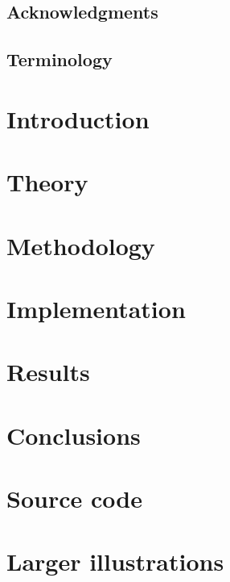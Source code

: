 \documentclass{report}
\begin{document}
\pagestyle{fancy}
\fancyhead{}
\fancyfoot[C]{\thepage}
\begin{abstract}
    
\end{abstract}
\newpage

\section*{Acknowledgments}

\newpage
\tableofcontents

\newpage
\section*{Terminology}


\newpage
{}
\chapter{Introduction}
    
    \newpage
\chapter{Theory}
    
    \newpage
\chapter{Methodology}
    
    \newpage
\chapter{Implementation}
    
    \newpage
\chapter{Results}
    
    \newpage
\chapter{Conclusions}
    


\newpage
\renewcommand{\bibname}{References}
 


\appendix
\begin{appendices}
  \chapter{Source code}
  
  \chapter{Larger illustrations}
  
\end{appendices}
\end{document}
